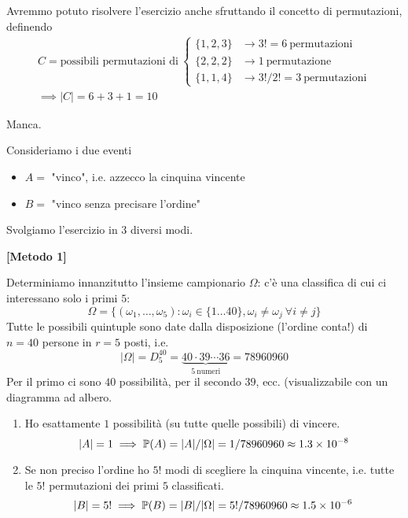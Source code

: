 \begin{enumerate}
	\begin{oss}
		Avremmo potuto risolvere l'esercizio anche sfruttando il concetto di permutazioni, definendo
		\begin{gather*}
			C=\text{possibili permutazioni di} \ 
			\begin{cases}
				\{1,2,3\} & \rightarrow 3!=6\ \text{permutazioni}\\
				\{2,2,2\} & \rightarrow 1\ \text{permutazione}\\
				\{1,1,4\} & \rightarrow 3!/2!=3\ \text{permutazioni}
			\end{cases}\\
			\implies | C| =6+3+1=10
		\end{gather*}
	\end{oss}
	
\end{enumerate}

\Soluzione

Manca.

\Soluzione

Consideriamo i due eventi
\begin{itemize}
	\item $A=$ "vinco", i.e. azzecco la cinquina vincente
	\item $B=$ "vinco senza precisare l'ordine"
\end{itemize}

Svolgiamo l'esercizio in $3$ diversi modi.

\textbf{[Metodo 1]}

Determiniamo innanzitutto l'insieme campionario $\Omega $: c'è una classifica di cui ci interessano solo i primi $5$:
\begin{equation*}
\Omega =\{( \omega _{1} ,\dots ,\omega _{5}) :\omega _{i} \in \{1\dots 40\} ,\omega _{i} \neq \omega _{j} \ \forall i\neq j\}
\end{equation*}
Tutte le possibili quintuple sono date dalla disposizione (l'ordine conta!) di $n=40$ persone in $r=5$ posti, i.e.
\begin{equation*}
| \Omega | =D_{5}^{40} =\underbrace{40\cdot 39\cdots 36}_{5\ \text{numeri}} =78960960
\end{equation*}
Per il primo ci sono $40$ possibilità, per il secondo $39$, ecc. (visualizzabile con un diagramma ad albero.
\begin{enumerate}
\item Ho esattamente $1$ possibilità (su tutte quelle possibili) di vincere.\begin{equation*}
| A| =1\implies \mathbb{P}( A) =| A| /| \Omega | =1/78960960\approx 1.3\times 10^{-8}
\end{equation*}
\item Se non preciso l'ordine ho $5!$ modi di scegliere la cinquina vincente, i.e. tutte le $5!$ permutazioni dei primi $5$ classificati.\begin{equation*}
| B| =5!\implies \mathbb{P}( B) =| B| /| \Omega | =5!/78960960\approx 1.5\times 10^{-6}
\end{equation*}
\end{enumerate}

